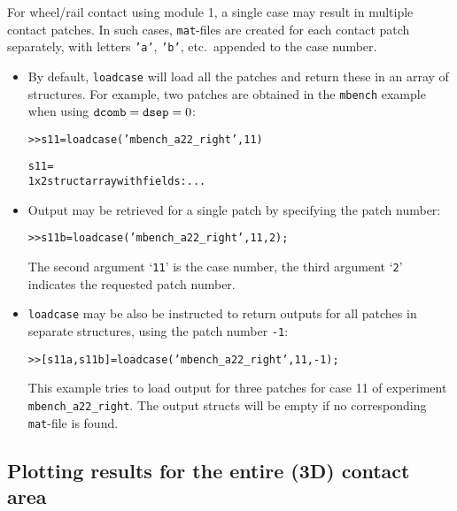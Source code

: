\documentclass[12pt]{report}
\begin{document}
For wheel/rail contact using module 1, a single case may result in multiple
contact patches. In such cases, {\tt mat}-files are created for each
contact patch separately, with letters {\tt 'a'}, {\tt 'b'}, etc.\ appended
to the case number.
\begin{itemize}
\item By default, {\tt loadcase} will load all the patches and return these
        in an array of structures. For example, two patches are obtained in
        the {\tt mbench} example when using ${\tt dcomb}={\tt dsep}=0$:
\begin{alltt}\small
    >> s11 = loadcase('mbench_a22_right', 11)

    s11 = 
           1x2 struct array with fields: ...
\end{alltt}
\item Output may be retrieved for a single patch by specifying the patch
        number:
\begin{alltt}\small
    >> s11b = loadcase('mbench_a22_right', 11, 2);
\end{alltt}
        The second argument `{\tt 11}' is the case number, the third
        argument `{\tt 2}' indicates the requested patch number. 
\item {\tt loadcase} may be also be instructed to return outputs for all
        patches in separate structures, using the patch number {\tt -1}:
\begin{alltt}\small
    >> [s11a, s11b] = loadcase('mbench_a22_right', 11, -1);
\end{alltt}
        This example tries to load output for three patches for case 11 of
        experiment {\tt mbench\_\-a22\_\-right}. The output structs will be
        empty if no corresponding {\tt mat}-file is found.
\end{itemize}


\subsection{Plotting results for the entire (3D) contact area}
\end{document}
